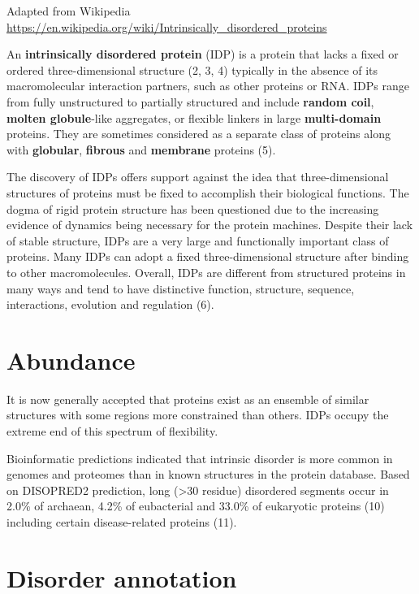 \documentclass[
]{book}
\begin{document}
Adapted from Wikipedia
\url{https://en.wikipedia.org/wiki/Intrinsically_disordered_proteins}

An \textbf{intrinsically disordered protein} (IDP) is a protein that lacks a fixed or ordered three-dimensional structure (2, 3, 4) typically in the absence of its macromolecular interaction partners, such as other proteins or RNA. IDPs range from fully unstructured to partially structured and include \textbf{random coil}, \textbf{molten globule}-like aggregates, or flexible linkers in large \textbf{multi-domain} proteins. They are sometimes considered as a separate class of proteins along with \textbf{globular}, \textbf{fibrous} and \textbf{membrane} proteins (5).

The discovery of IDPs offers support against the idea that three-dimensional structures of proteins must be fixed to accomplish their biological functions. The dogma of rigid protein structure has been questioned due to the increasing evidence of dynamics being necessary for the protein machines. Despite their lack of stable structure, IDPs are a very large and functionally important class of proteins. Many IDPs can adopt a fixed three-dimensional structure after binding to other macromolecules. Overall, IDPs are different from structured proteins in many ways and tend to have distinctive function, structure, sequence, interactions, evolution and regulation (6).

\hypertarget{abundance}{%
\section{Abundance}\label{abundance}}

It is now generally accepted that proteins exist as an ensemble of similar structures with some regions more constrained than others. IDPs occupy the extreme end of this spectrum of flexibility.

Bioinformatic predictions indicated that intrinsic disorder is more common in genomes and proteomes than in known structures in the protein database. Based on DISOPRED2 prediction, long (\textgreater30 residue) disordered segments occur in 2.0\% of archaean, 4.2\% of eubacterial and 33.0\% of eukaryotic proteins (10) including certain disease-related proteins (11).

\hypertarget{disorder-annotation}{%
\section{Disorder annotation}\label{disorder-annotation}}
\end{document}
